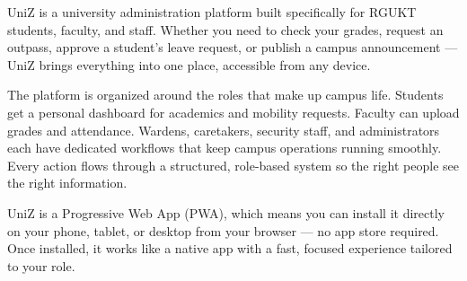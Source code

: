 


UniZ is a university administration platform built specifically for RGUKT students, faculty, and staff. Whether you need to check your grades, request an outpass, approve a student's leave request, or publish a campus announcement — UniZ brings everything into one place, accessible from any device.

The platform is organized around the roles that make up campus life. Students get a personal dashboard for academics and mobility requests. Faculty can upload grades and attendance. Wardens, caretakers, security staff, and administrators each have dedicated workflows that keep campus operations running smoothly. Every action flows through a structured, role-based system so the right people see the right information.

UniZ is a Progressive Web App (PWA), which means you can install it directly on your phone, tablet, or desktop from your browser — no app store required. Once installed, it works like a native app with a fast, focused experience tailored to your role.


